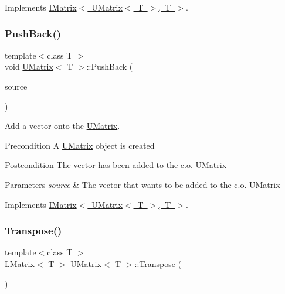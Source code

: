 Implements \mbox{\hyperlink{class_i_matrix_a1ed62ee6700728045083c7f0df3e3e62}{I\+Matrix$<$ U\+Matrix$<$ T $>$, T $>$}}.

\mbox{\label{class_u_matrix_a57003b0a0f3fe394ab04f9588732a928}} 
\subsubsection{\texorpdfstring{PushBack()}{PushBack()}}
{\footnotesize\ttfamily template$<$class T $>$ \\
void \mbox{\hyperlink{class_u_matrix}{U\+Matrix}}$<$ T $>$\+::Push\+Back (\begin{DoxyParamCaption}\item[{const \mbox{\hyperlink{class_my_vector}{My\+Vector}}$<$ T $>$ \&}]{source }\end{DoxyParamCaption})\hspace{0.3cm}{\ttfamily [virtual]}}



Add a vector onto the \mbox{\hyperlink{class_u_matrix}{U\+Matrix}}. 

\begin{DoxyPrecond}{Precondition}
A \mbox{\hyperlink{class_u_matrix}{U\+Matrix}} object is created 
\end{DoxyPrecond}
\begin{DoxyPostcond}{Postcondition}
The vector has been added to the c.\+o. \mbox{\hyperlink{class_u_matrix}{U\+Matrix}}
\end{DoxyPostcond}

\begin{DoxyParams}{Parameters}
{\em source} & The vector that wants to be added to the c.\+o. \mbox{\hyperlink{class_u_matrix}{U\+Matrix}} \\
\hline
\end{DoxyParams}


Implements \mbox{\hyperlink{class_i_matrix_aa5de147c7aa5b74b0f2177ed1a8158de}{I\+Matrix$<$ U\+Matrix$<$ T $>$, T $>$}}.

\mbox{\label{class_u_matrix_a7b8f7cc5acf42e18dcaabbc49533c6b8}} 
\subsubsection{\texorpdfstring{Transpose()}{Transpose()}}
{\footnotesize\ttfamily template$<$class T $>$ \\
\mbox{\hyperlink{class_l_matrix}{L\+Matrix}}$<$ T $>$ \mbox{\hyperlink{class_u_matrix}{U\+Matrix}}$<$ T $>$\+::Transpose (\begin{DoxyParamCaption}{ }\end{DoxyParamCaption})}



